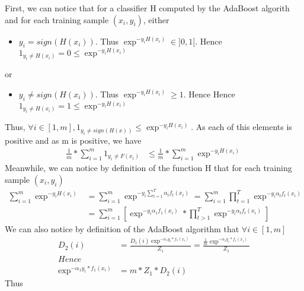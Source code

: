\documentclass[12pt]{article}											%
\begin{document}
First, we can notice that for a classifier H computed by the AdaBoost algorith and for each training sample $(x_i, y_i)$, either
	\begin{itemize}
		\item $y_i = sign(H(x_i))$.   Thus $\exp^{- y_i H(x_i)} \in ]0, 1[$.   Hence $1_{y_i \neq H(x_i)} = 0 \leq \exp^{- y_i H(x_i)}$
    \end{itemize}
or
	\begin{itemize}
		\item $y_i \neq sign(H(x_i))$.   Thus $\exp^{- y_i H(x_i)} \geq 1$.   Hence Hence $1_{y_i \neq H(x_i)} = 1 \leq \exp^{- y_i H(x_i)}$
	\end{itemize}
Thus, $\forall i \in [1, m], 1_{y_i \neq sign(H(x))} \leq {\exp^{-y_i H(x_i)}}$.   As each of this elements is positive and as m is positive, we have
	\begin{equation}
	\begin{aligned}
		\frac{1}{m} * \sum_{i=1}^{m} 	{1_{y_i \neq F(x_i)}} & \leq \frac{1}{m} * \sum_{i=1}^{m}{\exp^{-y_i H(x_i)}}
        \label{inequality:boundedTrainingError}
	\end{aligned}
	\end{equation}
Meanwhile, we can notice by definition of the function H that for each training sample $(x_i, y_i)$
	\begin{equation*}
	\begin{aligned}
			\sum_{i=1}^{m}{\exp^{-y_i H(x_i)}}	&= \sum_{i=1}^{m}{\exp^{-y_i  \sum_{t=1}^{T}{\alpha_t f_t(x_i) }  }} 
												= \sum_{i=1}^{m}{\prod_{t=1}^{T}{\exp^{-y_i \alpha_t f_t(x_i)} }} \\
												&= \sum_{i=1}^{m}{[\exp^{-y_i \alpha_1 f_1(x_i)} * \prod_{t>1}^{T}{\exp^{-y_i \alpha_t f_t(x_i)} }]}
	\label{equation:partialBound}
	\end{aligned}
	\end{equation*}
We can also notice by definition of the AdaBoost algorithm that $\forall i \in [1, m]$
	\begin{equation*}
	\begin{aligned}
		D_2(i)	&= \frac{D_1(i) \exp^{-\alpha_1 y_i * f_1(x_i)}}{Z_1} 
				= \frac{\frac{1}{m} \exp^{-\alpha_1 y_i * f_1(x_i)}}{Z_1} \\
         Hence \\
		\exp^{-\alpha_1 y_i * f_1(x_i)}		&= m * Z_1 * D_2(i)
	\end{aligned}
	\end{equation*}
Thus
\end{document}
